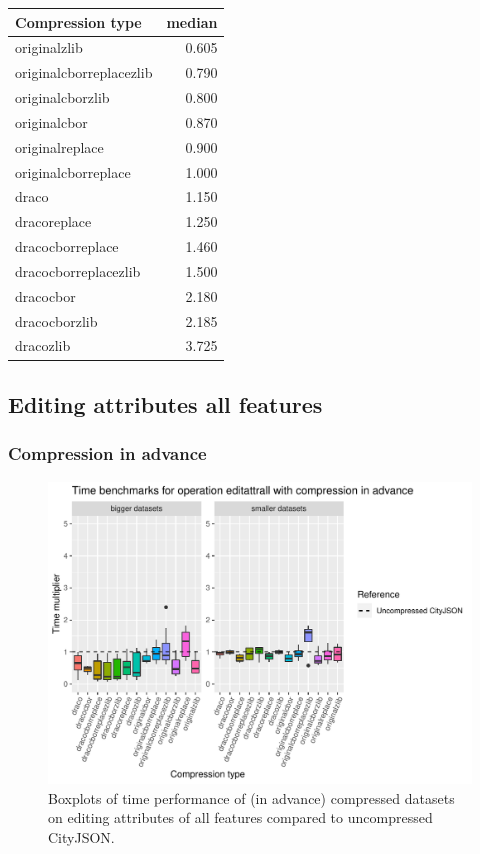 \begin{table}[!h]
\begin{minipage}{.5\linewidth}
\begin{tabular}{|l|r|}
\hline
Compression type & median\\
\hline
originalzlib & 0.605\\
\hline
originalcborreplacezlib & 0.790\\
\hline
originalcborzlib & 0.800\\
\hline
originalcbor & 0.870\\
\hline
originalreplace & 0.900\\
\hline
originalcborreplace & 1.000\\
\hline
draco & 1.150\\
\hline
dracoreplace & 1.250\\
\hline
dracocborreplace & 1.460\\
\hline
dracocborreplacezlib & 1.500\\
\hline
dracocbor & 2.180\\
\hline
dracocborzlib & 2.185\\
\hline
dracozlib & 3.725\\
\hline
\end{tabular}
\end{minipage} 
\end{table}

\newpage


\subsection{Editing attributes all features}

\subsubsection{Compression in advance}

\begin{figure}[h!]
    \includegraphics[scale=0.92]{figs/benchmark/individual/editattrall.pdf}
    \caption{Boxplots of time performance of (in advance) compressed datasets on editing attributes of all features compared to uncompressed CityJSON.}
    \label{fig:sdvis}
\end{figure}

